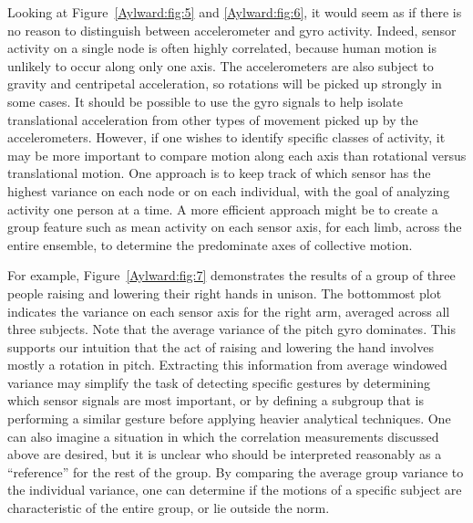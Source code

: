 Looking at Figure~\ref{Aylward:fig:5} and \ref{Aylward:fig:6}, it would seem as if there is no reason to distinguish
between accelerometer and gyro activity. Indeed, sensor activity on a single node
is often highly correlated, because human motion is unlikely to occur along only
one axis. The accelerometers are also subject to gravity and centripetal
acceleration, so rotations will be picked up strongly in some cases. It should be
possible to use the gyro signals to help isolate translational acceleration from
other types of movement picked up by the accelerometers. However, if one wishes
to identify specific classes of activity, it may be more important to compare
motion along each axis than rotational versus translational motion. One approach
is to keep track of which sensor has the highest variance on each node or on each
individual, with the goal of analyzing activity one person at a time.  A more
efficient approach might be to create a group feature such as mean activity on
each sensor axis, for each limb, across the entire ensemble, to determine the
predominate axes of collective motion.

For example, Figure~\ref{Aylward:fig:7} demonstrates the results of a group of three people
raising and lowering their right hands in unison. The bottommost plot indicates
the variance on each sensor axis for the right arm, averaged across all three
subjects. Note that the average variance of the pitch gyro dominates. This
supports our intuition that the act of raising and lowering the hand involves
mostly a rotation in pitch. Extracting this information from average windowed
variance may simplify the task of detecting specific gestures by determining
which sensor signals are most important, or by defining a subgroup that is
performing a similar gesture before applying heavier analytical techniques. One
can also imagine a situation in which the correlation measurements discussed
above are desired, but it is unclear who should be interpreted reasonably as a
``reference'' for the rest of the group. By comparing the average group variance
to the individual variance, one can determine if the motions of a specific
subject are characteristic of the entire group, or lie outside the norm.

